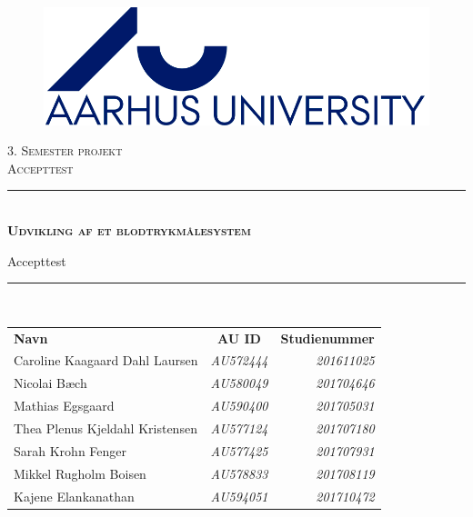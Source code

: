 \thispagestyle{empty}
\newcommand{\HRule}{\rule{\linewidth}{0.1mm}} %

\begin{center}
	\vspace{5cm}
	
	\begin{figure}[h!]
		\centering
		\includegraphics[width=0.5\linewidth]{Forside/AUlogo}
	\end{figure}
	
	\vspace{0.1 in}
	
	\textsc{\large 3. Semester projekt \\Accepttest}\\[1.5cm] 
	
	\HRule \\[0.8cm]
	{\huge \bfseries \textsc{Udvikling af et blodtrykmålesystem}} 
	
	{\LARGE Accepttest} \\[0.4cm]
	\HRule \\[1.5cm]
	
	
	
	
	\vspace{0.2 in}
	\begin{center}
		\begin{tabular}{l c r}
			\textbf{Navn} & \textbf{AU ID} & \textbf{Studienummer} \\
			Caroline Kaagaard Dahl Laursen & \textsl{AU572444} & \textsl{201611025}  \\
			Nicolai Bæch & \textsl{AU580049} & \textsl{201704646}  \\
			Mathias Egsgaard & \textsl{AU590400} & \textsl{201705031}  \\
			Thea Plenus Kjeldahl Kristensen & \textsl{AU577124} & \textsl{201707180}  \\
			Sarah Krohn Fenger & \textsl{AU577425} & \textsl{201707931}  \\
			Mikkel Rugholm Boisen & \textsl{AU578833} & \textsl{201708119}  \\
			Kajene Elankanathan & \textsl{AU594051} & \textsl{201710472}  \\
			

\end{tabular}
\end{center}
\end{center}
